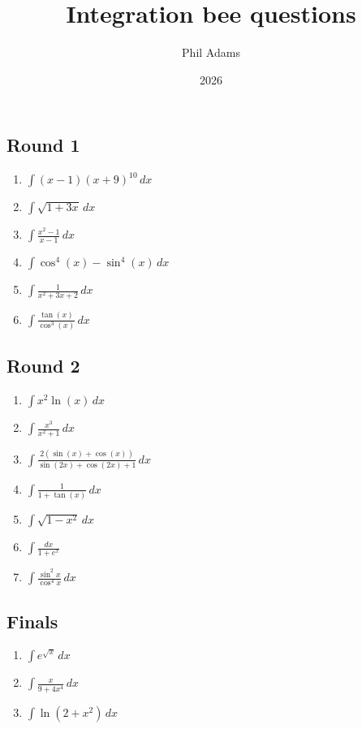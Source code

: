 \documentclass[12pt, letterpaper]{article}
\title{Integration bee questions}
\author{Phil Adams}
\date{2026}
\begin{document}
\maketitle

\pagebreak
\Large
\subsection*{Round 1}
\begin{enumerate}[itemsep=5cm]
    \item 
    $\int (x-1)(x+9)^{10}\,dx$

    \item 
    $\int \sqrt{1+3x}\,dx$

    \item 
    $\int \frac{x^2 -1}{x-1}\,dx$

    \item
    $\int \cos^4(x)-\sin^4(x)\,dx$

    \item 
    $\int \frac{1}{x^2+3x+2}\,dx$

    \item 
    $\int \frac{\tan(x)}{\cos^3(x)}\,dx$

\end{enumerate}
\pagebreak
\subsection*{Round 2}
\begin{enumerate}[itemsep=5cm]
    \item 
    $\int x^2\ln(x)\, dx$

    \item 
    $\int \frac{x^3}{x^2 +1}\,dx$

    \item
    $\int \frac{2(\sin(x)+\cos(x))}{\sin(2x)+\cos(2x)+1}\, dx$

    \item 
    $\int \frac{1}{1+\tan(x)}\,dx$

    \item
    $\int \sqrt{1-x^2}\,dx$

    \item 
    $\int \frac{dx}{1+e^x}$

    \item
    $\int \frac{\sin^2{x}}{\cos^4{x}}\,dx$
\end{enumerate}
\pagebreak
\subsection*{Finals}
\begin{enumerate}[itemsep=5cm]
    \item
    $\int e^{\sqrt{x}}\,dx$

    \item 
    $\int \frac{x}{9+4x^4}\,dx$

    \item
    $\int \ln(2+x^2)\,dx$

\end{enumerate}
\pagebreak
\end{document}
